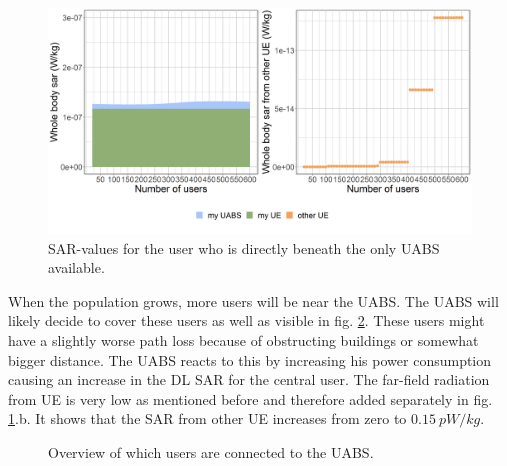 \documentclass[twocolumn]{phdsymp} %
\begin{document}
\begin{figure}[h]
\centering
  \includegraphics[width=\linewidth]{s2/uvsulsarcentralUser.png}
  \caption{SAR-values for the user who is directly beneath the only \acs{UABS} available.}
  \label{fig:uvsulsarcentralUsers}
\end{figure}
\FloatBarrier

When the population grows, more users
will be near the \gls{UABS}. The \gls{UABS} will likely decide to cover these users as well as visible in fig. \ref{fig:connectionMap}.
These users might have a slightly 
worse path loss because of obstructing buildings or somewhat bigger distance. The \gls{UABS} reacts to this by increasing 
his power consumption causing an increase in the \gls{DL} \gls{SAR} for the central user.
The far-field radiation from \gls{UE} is very low as mentioned before and therefore added separately in fig. \ref{fig:uvsulsarcentralUsers}.b.
It shows that the \gls{SAR}  from other \gls{UE} increases from zero to $0.15\ pW/kg$. 
\begin{figure}[h]
\hfill
{}
\caption{Overview of which users are connected to the \acs{UABS}.}
  \label{fig:connectionMap}
\end{figure}
\FloatBarrier
\end{document}

